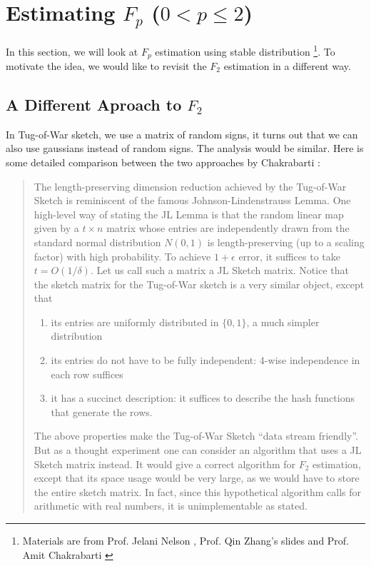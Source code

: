 \documentclass[11pt]{article}
\theoremstyle{plain}
\begin{document}
\section{Estimating $F_p$ ($0<p\leq2$) }
\label{s:norm-stabled}

In this section, we will look at $F_p$ estimation using stable distribution
\footnote{Materials are from 
Prof. Jelani Nelson  \cite{Nel2015-web}, Prof. Qin Zhang's 
slides  \cite{zhang2017-slides} and Prof. Amit 
Chakrabarti  \cite{Cha2015-notes}}. To 
motivate the idea, we would like to revisit the $F_2$ estimation in a different 
way. 

\subsection{A Different Aproach to $F_2$}

In Tug-of-War sketch, we use a matrix of random signs, it turns out that we 
can also use gaussians instead of random signs. The analysis would be 
similar. Here is some detailed comparison between the two approaches by 
Chakrabarti  \cite{Cha2015-notes}:

\begin{quotation}
The length-preserving dimension reduction achieved by the Tug-of-War 
Sketch is reminiscent of the famous Johnson-Lindenstrauss
Lemma. One high-level way of stating the JL Lemma is that the random linear 
map given by a $t\times n$ matrix whose entries are independently drawn 
from the standard normal distribution $N(0,1)$ is
length-preserving (up to a scaling factor) with high probability. To achieve 
$1+\epsilon$ error, it suffices to take $t=O(1/\delta)$. 
Let us call such a matrix a JL Sketch matrix. Notice that the sketch matrix for 
the Tug-of-War sketch is a very similar object, except that\begin{enumerate}
	\item  its entries are uniformly distributed in $\{0,1\}$, a much simpler 
	distribution
	\item its entries do not have to be fully independent: 4-wise independence 
	in each row suffices
	\item it has a succinct description: it suffices to describe the hash 
	functions that generate the rows.
\end{enumerate}
The above properties make the Tug-of-War Sketch “data stream friendly”. 
But as a thought experiment one can consider an algorithm that uses a JL 
Sketch matrix instead. It would give a correct algorithm for $F_2$ estimation,
except that its space usage would be very large, as we would have to store 
the entire sketch matrix. In fact, since this hypothetical algorithm calls for 
arithmetic with real numbers, it is unimplementable as stated.
\end{quotation}
\end{document}
